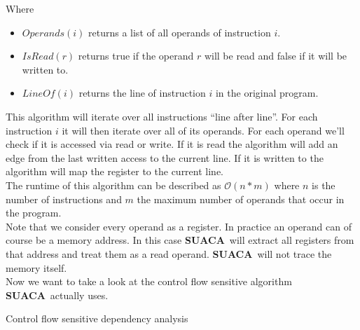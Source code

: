 \documentclass[a4paper,12pt,titlepage, twoside]{report}
\newcommand{\suaca}{\textbf{SUACA}}
\begin{document}
Where
\begin{itemize}
    \item $Operands(i)$ returns a list of all operands of instruction $i$.
    \item $IsRead(r)$ returns true if the operand $r$ will be read and false if it will be written to.
    \item $LineOf(i)$ returns the line of instruction $i$ in the original program.
\end{itemize}

This algorithm will iterate over all instructions ``line after line''. For each instruction $i$ it will then iterate over all of its operands. For each operand we'll check if it is accessed via read or write. If it is read the algorithm will add an edge from the last written access to the current line. If it is written to the algorithm will map the register to the current line.\\

The runtime of this algorithm can be described as $\mathcal{O}(n*m)$ where $n$ is the number of instructions and $m$ the maximum number of operands that occur in the program.\\

Note that we consider every operand as a register. In practice an operand can of course be a memory address. In this case \suaca\ will extract all registers from that address and treat them as a read operand. \suaca\ will not trace the memory itself.\\

Now we want to take a look at the control flow sensitive algorithm \suaca\ actually uses. 

\begin{algorithm}[H]
    \SetAlgoLined
    \caption{Control flow sensitive dependency analysis}
    \label{alg:dep}
\end{algorithm}
\end{document}

